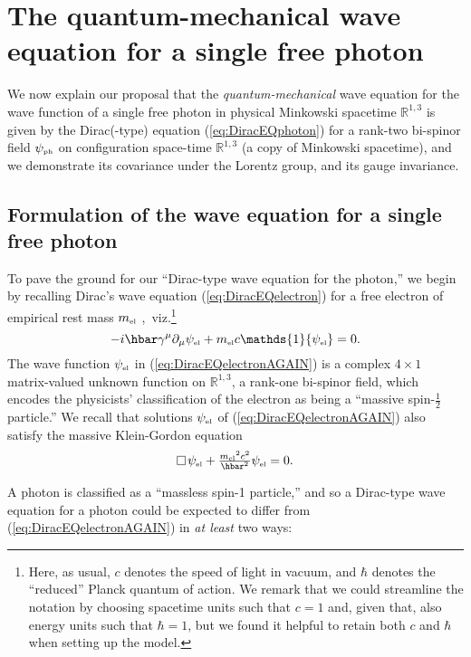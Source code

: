 \documentclass[12pt]{article}
\theoremstyle{definition}
\newcommand{\refeq}[1]{(\ref{#1})}
\numberwithin{equation}{section}
\newcommand{\beq}{\begin{equation}}
\newcommand{\eeq}{\end{equation}}
\newcommand{\Id}{\mathds{1}}
\newcommand{\psiPH}{{\psi_{\mbox{\rm\tiny ph}}}}
\newcommand{\psiEL}{{\psi_{\mbox{\rm\tiny el}}}}
\newcommand{\mEL}{{m_{\mbox{\rm\tiny el}}}}
\newcommand{\Rset}{{\mathbb R}}
\newcommand{\ga}{\gamma}
\newcommand{\dal}{\raisebox{3pt}{\fbox{}}\,}
\begin{document}
\section{The quantum-mechanical wave equation for a single free photon}\label{sec:qmwe}
%
 We now explain our proposal that the  \emph{quantum-mechanical} wave equation for the wave
function of a single free photon in physical Minkowski spacetime $\Rset^{1,3}$ is given by  
the Dirac(-type) equation \refeq{eq:DiracEQphoton} for a rank-two bi-spinor field $\psiPH$ on configuration space-time $\Rset^{1,3}$ 
(a copy of Minkowski spacetime), and we demonstrate its covariance under the Lorentz group, and its gauge invariance.

\subsection{Formulation of the wave equation for a single free photon}\label{sec:QMWE}

 To pave the ground for our ``Dirac-type wave equation for the photon,'' we begin by recalling Dirac's wave equation \refeq{eq:DiracEQelectron} 
for a free electron of empirical rest mass $\mEL$ \cite{Dirac1928a,Dirac1928b},\!~viz.\footnote{Here,
as usual, $c$ denotes the speed of light in vacuum, and $\hbar$ denotes the ``reduced'' Planck quantum of action.
 We remark that we could streamline the notation by choosing spacetime units such that $c=1$ and, given that, also
energy units such that $\hbar=1$, 
but we found it helpful to retain both $c$ and $\hbar$ when setting up the model.} 
\beq \label{eq:DiracEQelectronAGAIN} 
{ -i\hbar \ga^\mu \partial_\mu \psiEL + \mEL c \Id \psiEL =0}.
\eeq
 The wave function $\psiEL$ in \refeq{eq:DiracEQelectronAGAIN} is a complex $4\times 1$ matrix-valued unknown function on $\Rset^{1,3}$, 
a rank-one bi-spinor field, which encodes the physicists' classification of the electron as being a ``massive spin-$\frac12$ particle.''  
 We recall that solutions $\psiEL$ of \refeq{eq:DiracEQelectronAGAIN} also satisfy the massive Klein-Gordon equation
\beq \label{eq:massivKGeq}
\dal\psiEL + \tfrac{\mEL^2c^2}{\hbar^2}\psiEL =0.
\eeq

 A photon is classified as a ``massless spin-1 particle,'' and so a Dirac-type wave equation for a photon could be expected 
to differ from \refeq{eq:DiracEQelectronAGAIN} in \emph{at least} two ways: 
\end{document}
